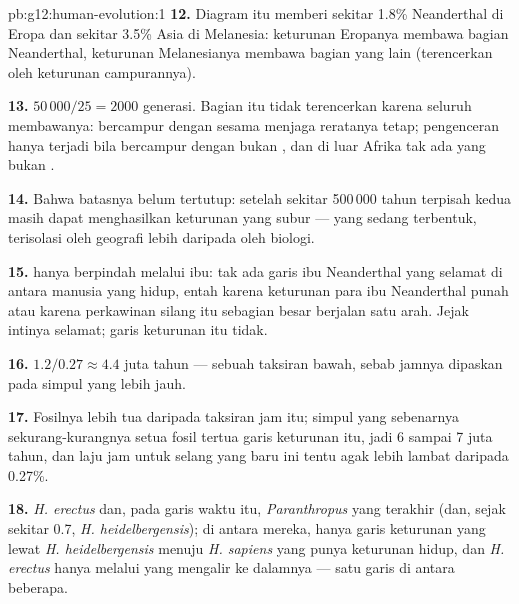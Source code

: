 \begin{solution}{pb:g12:human-evolution:1}
\textbf{12.} Diagram itu memberi sekitar 1.8\% Neanderthal di Eropa
dan sekitar 3.5\%   Asia di Melanesia: keturunan Eropanya
membawa bagian Neanderthal, keturunan Melanesianya membawa bagian yang
lain (terencerkan oleh keturunan campurannya).

\textbf{13.} $50\,000/25 = 2000$ generasi. Bagian itu tidak terencerkan
karena seluruh  membawanya: bercampur dengan sesama 
menjaga reratanya tetap; pengenceran hanya terjadi bila 
bercampur dengan bukan , dan di luar Afrika tak ada yang bukan
.

\textbf{14.} Bahwa batasnya belum tertutup: setelah sekitar 500\,000
tahun terpisah kedua  masih dapat menghasilkan keturunan yang
subur ---  yang sedang terbentuk, terisolasi oleh geografi
lebih daripada oleh biologi.

\textbf{15.}  hanya berpindah melalui ibu: tak ada garis
ibu Neanderthal yang selamat di antara manusia yang hidup, entah
karena keturunan para ibu Neanderthal punah atau karena perkawinan
silang itu sebagian besar berjalan satu arah. Jejak intinya selamat;
garis keturunan itu tidak.

\textbf{16.} $1.2/0.27 \approx 4.4$ juta tahun --- sebuah taksiran
bawah, sebab jamnya dipaskan pada simpul yang lebih jauh.

\textbf{17.} Fosilnya lebih tua daripada taksiran jam itu; simpul yang
sebenarnya sekurang-kurangnya setua fosil tertua garis keturunan itu,
jadi 6 sampai 7 juta tahun, dan laju jam untuk selang yang baru ini
tentu agak lebih lambat daripada 0.27\%.

\textbf{18.} \emph{H. erectus} dan, pada garis waktu itu,
\emph{Paranthropus} yang terakhir (dan, sejak sekitar 0.7,
\emph{H. heidelbergensis}); di antara mereka, hanya garis keturunan
yang lewat \emph{H. heidelbergensis} menuju \emph{H. sapiens} yang
punya keturunan hidup, dan \emph{H. erectus} hanya melalui 
yang mengalir ke dalamnya --- satu garis di antara beberapa.


\end{solution}
